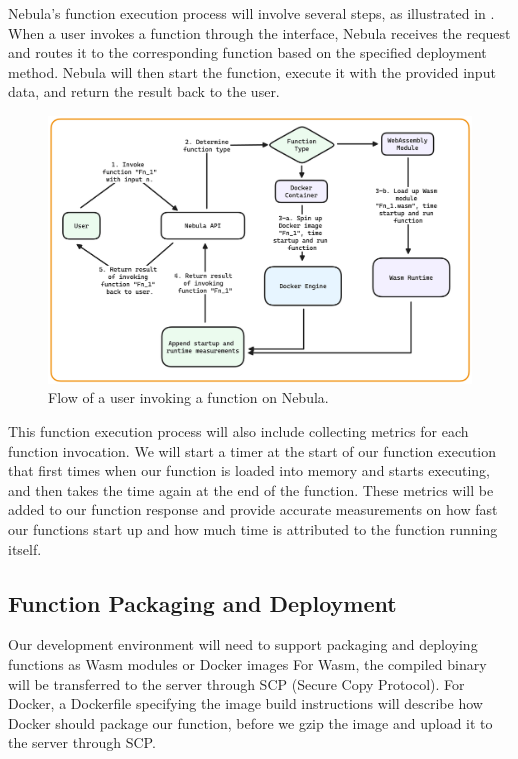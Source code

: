 \documentclass[
  table]{report}
\begin{document}
Nebula's function execution process will involve several steps, as
illustrated in . When a user invokes
a function through the interface, Nebula receives the request and routes
it to the corresponding function based on the specified deployment
method. Nebula will then start the function, execute it with the
provided input data, and return the result back to the user.

\begin{figure}[H]
\centering
  \includegraphics{assets/5-nebula-function-execution.png}
  \caption{Flow of a user invoking a function on Nebula.}
  \label{fig:function-execution-design}
\end{figure}

This function execution process will also include collecting metrics for
each function invocation. We will start a timer at the start of our
function execution that first times when our function is loaded into
memory and starts executing, and then takes the time again at the end of
the function. These metrics will be added to our function response and
provide accurate measurements on how fast our functions start up and how
much time is attributed to the function running itself.

\subsection{Function Packaging and Deployment}

Our development environment will need to support packaging and deploying
functions as \ac{Wasm} modules or Docker images For Wasm, the compiled
binary will be transferred to the server through SCP (Secure Copy
Protocol). For Docker, a Dockerfile specifying the image build
instructions will describe how Docker should package our function,
before we gzip the image and upload it to the server through SCP.
\end{document}
